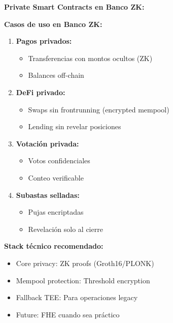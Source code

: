 \documentclass[11pt,a4paper,twoside]{book}
\theoremstyle{definition}
\theoremstyle{remark}
\begin{document}
\begin{bancozk}
\textbf{Private Smart Contracts en Banco ZK:}

\begin{center}
\end{center}

\textbf{Casos de uso en Banco ZK:}
\begin{enumerate}
    \item \textbf{Pagos privados:}
    \begin{itemize}
        \item Transferencias con montos ocultos (ZK)
        \item Balances off-chain
    \end{itemize}
    
    \item \textbf{DeFi privado:}
    \begin{itemize}
        \item Swaps sin frontrunning (encrypted mempool)
        \item Lending sin revelar posiciones
    \end{itemize}
    
    \item \textbf{Votación privada:}
    \begin{itemize}
        \item Votos confidenciales
        \item Conteo verificable
    \end{itemize}
    
    \item \textbf{Subastas selladas:}
    \begin{itemize}
        \item Pujas encriptadas
        \item Revelación solo al cierre
    \end{itemize}
\end{enumerate}

\textbf{Stack técnico recomendado:}
\begin{itemize}
    \item Core privacy: ZK proofs (Groth16/PLONK)
    \item Mempool protection: Threshold encryption
    \item Fallback TEE: Para operaciones legacy
    \item Future: FHE cuando sea práctico
\end{itemize}
\end{bancozk}
\end{document}
